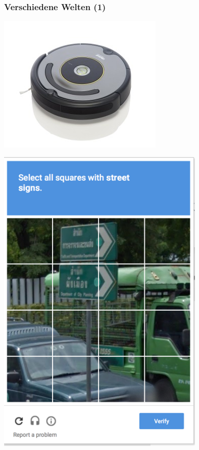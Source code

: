 \documentclass[aspectratio=43,x11names]{beamer}
\begin{document}
\begin{frame}[fragile]
\frametitle{Verschiedene Welten (1)}

\begin{minipage}{0.45\textwidth}
\begin{center}
\includegraphics[width=\textwidth]{images/roomba} 
\end{center}
\end{minipage}
\begin{minipage}{0.45\textwidth}
\begin{center}
\includegraphics[width=0.75\textwidth]{images/recaptcha}
\end{center}
\end{minipage}

\end{frame}
\end{document}
